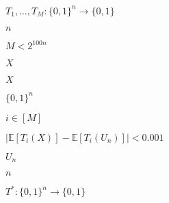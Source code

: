 \documentclass[10pt]{book}
\begin{document}
\begin{mdSnippets}
\newcommand{\zo}{\{0,1\}}
\newcommand{\getsr}{\leftarrow_{\text{\tiny R}}}
\newcommand{\E}{\mathbb{E}}
\newcommand{\N}{\mathbb{N}}

\begin{mdInlineSnippet}%
$T_1,\ldots,T_M:\zo^n\rightarrow\zo$\end{mdInlineSnippet}%
\begin{mdInlineSnippet}[7b8b965ad4bca0e41ab51de7b31363a1]%
$n$\end{mdInlineSnippet}%
\begin{mdInlineSnippet}[e632d85d9ee273672fc54d53ec6765de]%
$M<2^{100n}$\end{mdInlineSnippet}%
\begin{mdInlineSnippet}[02129bb861061d1a052c592e2dc6b383]%
$X$\end{mdInlineSnippet}%
\begin{mdInlineSnippet}[02129bb861061d1a052c592e2dc6b383]%
$X$\end{mdInlineSnippet}%
\begin{mdInlineSnippet}[5867c9b098884eca2779f6d98d4b0b29]%
$\zo^n$\end{mdInlineSnippet}%
\begin{mdInlineSnippet}[261d749b47399ed663c2a5df36226910]%
$i\in [M]$\end{mdInlineSnippet}%
\begin{mdInlineSnippet}%
$| \E[ T_i(X)]-\E[T_i(U_n)]|<0.001$\end{mdInlineSnippet}%
\begin{mdInlineSnippet}%
$U_n$\end{mdInlineSnippet}%
\begin{mdInlineSnippet}[7b8b965ad4bca0e41ab51de7b31363a1]%
$n$\end{mdInlineSnippet}%
\begin{mdInlineSnippet}[7e9b1b782f00c0d67d0a8fbdf5fc5e5b]%
$T^*:\zo^n\rightarrow\zo$\end{mdInlineSnippet}%
\begin{mdInlineSnippet}%

\end{mdInlineSnippet}
\end{mdSnippets}
\end{document}
